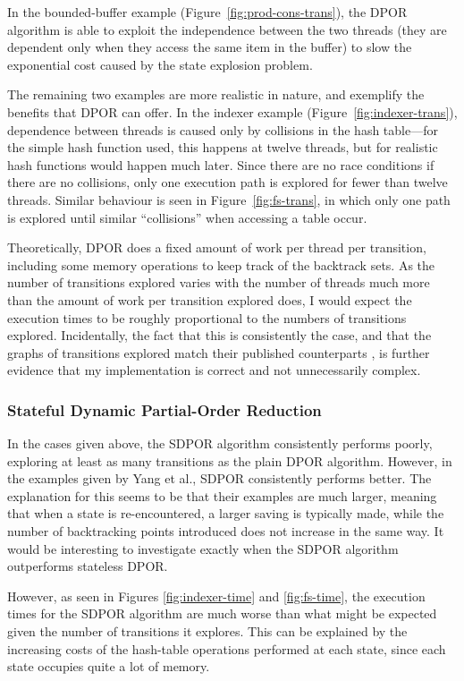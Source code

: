 \documentclass[12pt,a4paper,twoside,openany]{report}
\begin{document}
In the bounded-buffer example
(Figure~\ref{fig:prod-cons-trans}),
the DPOR algorithm is able to exploit
the independence between the two threads
(they are dependent only when they
access the same item in the buffer) to
slow the
exponential cost caused by the
state explosion problem.

The remaining two examples are more
realistic in nature, and exemplify the
benefits that DPOR can offer.
In the indexer example
(Figure~\ref{fig:indexer-trans}),
dependence between
threads is caused only by collisions
in the hash table---for the simple
hash function used, this happens at twelve threads,
but for realistic hash functions would
happen much later. Since there are no
race conditions if there are no collisions,
only one execution path
is explored for fewer than twelve threads.
Similar behaviour is seen in
Figure~\ref{fig:fs-trans}, in which only
one path is explored until similar ``collisions''
when accessing a table occur.

Theoretically, DPOR does a fixed amount of
work per thread per transition, including some
memory operations to keep track of the backtrack
sets. As the number of transitions explored
varies with
the number of threads much more than the amount
of work per transition explored does, I would
expect the execution times to be roughly
proportional to the numbers of transitions
explored. Incidentally, the fact that this is consistently
the case, and that the graphs of transitions
explored match their published counterparts
\cite{flan05},
is further evidence that my
implementation is correct and not
unnecessarily complex.

\subsubsection{Stateful Dynamic Partial-Order Reduction}
In the cases given above, the SDPOR algorithm
consistently performs poorly, exploring at
least as many transitions as the plain
DPOR algorithm. However, in the examples
given by Yang et al.\@ \cite{yang08},
SDPOR consistently performs better.
The explanation for this seems to be that
their examples are much larger, meaning
that when a state is re-encountered,
a larger saving is typically made,
while the number of backtracking
points introduced does not increase
in the same way. It would be interesting
to investigate exactly when the SDPOR
algorithm outperforms stateless DPOR.

However, as seen in Figures
\ref{fig:indexer-time} and \ref{fig:fs-time},
the execution times for the SDPOR algorithm
are much worse than what might be
expected given the number of
transitions it explores.
This can be explained by the increasing
costs of the hash-table operations
performed at each state, since each
state occupies quite a lot of memory.
\end{document}
